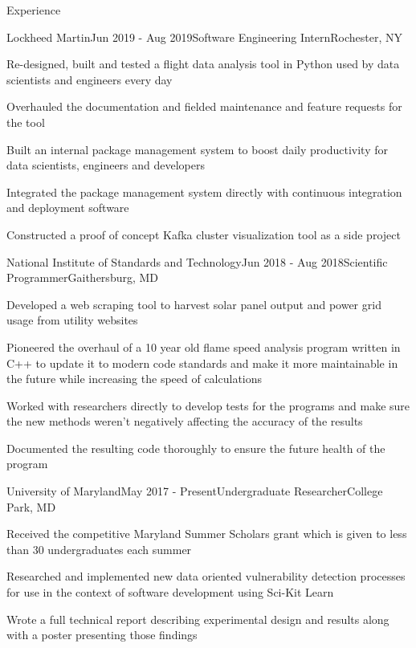 \documentclass{resume} %
\begin{document}
\begin{rSection}{Experience}


\begin{rSubsection}{Lockheed Martin}{Jun 2019 - Aug 2019}{Software Engineering Intern}{Rochester, NY}
\item Re-designed, built and tested a flight data analysis tool in Python used by data scientists and engineers every day
\item Overhauled the documentation and fielded maintenance and feature requests for the tool
\item Built an internal package management system to boost daily productivity for data scientists, engineers and developers
\item Integrated the package management system directly with continuous integration and deployment software
\item Constructed a proof of concept Kafka cluster visualization tool as a side project
\end{rSubsection}


\begin{rSubsection}{National Institute of Standards and Technology}{Jun 2018 - Aug 2018}{Scientific Programmer}{Gaithersburg, MD}
\item Developed a web scraping tool to harvest solar panel output and power grid usage from utility websites
\item Pioneered the overhaul of a 10 year old flame speed analysis program written in C++ to update it to modern code standards and make it more maintainable in the future while increasing the speed of calculations
\item Worked with researchers directly to develop tests for the programs and make sure the new methods weren't negatively affecting the accuracy of the results
\item Documented the resulting code thoroughly to ensure the future health of the program
\end{rSubsection}


\begin{rSubsection}{University of Maryland}{May 2017 - Present}{Undergraduate Researcher}{College Park, MD}
\item Received the competitive Maryland Summer Scholars grant which is given to less than 30 undergraduates each summer
\item Researched and implemented new data oriented vulnerability detection processes for use in the context of software development using Sci-Kit Learn
\item Wrote a full technical report describing experimental design and results along with a poster presenting those findings
\end{rSubsection}


\end{rSection}
\end{document}
